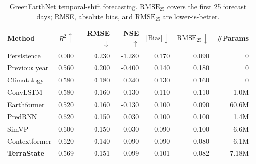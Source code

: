 \begin{table}[t]
\centering
{\small
\setlength{\tabcolsep}{7.0pt}
\renewcommand{\arraystretch}{0.70}
\begin{tabular}{lrrrrrr}
\toprule
Method & $R^2\uparrow$ & RMSE$\downarrow$ & NSE$\uparrow$ &
$|\mathrm{Bias}|\downarrow$ & $\mathrm{RMSE}_{25}\downarrow$ &
\#Params\\
\midrule
Persistence & 0.000 & 0.230 & -1.280 & 0.170 & 0.090 & 0\\
Previous year & 0.560 & 0.200 & -0.400 & 0.140 & 0.180 & 0\\
Climatology & 0.580 & 0.180 & -0.340 & 0.130 & 0.160 & 0\\
ConvLSTM & 0.580 & 0.160 & -0.130 & 0.110 & 0.110 & 1.0M\\
Earthformer & 0.520 & 0.160 & -0.130 & 0.100 & 0.090 & 60.6M\\
PredRNN & 0.620 & 0.150 & 0.030 & 0.100 & 0.100 & 1.4M\\
SimVP & 0.600 & 0.150 & 0.030 & 0.090 & 0.100 & 6.6M\\
Contextformer & 0.620 & 0.140 & 0.090 & 0.090 & 0.080 & 6.1M\\
\textbf{TerraState} & 0.569 & 0.151 & -0.099 & 0.101 & 0.082 & 7.18M\\
\bottomrule
\end{tabular}
}
\caption{GreenEarthNet temporal-shift forecasting. $\mathrm{RMSE}_{25}$ covers
the first 25 forecast days; RMSE, absolute bias, and $\mathrm{RMSE}_{25}$ are
lower-is-better.}
\label{tab:forecast}
\end{table}
